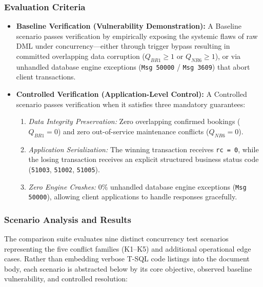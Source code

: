 \subsubsection{Evaluation Criteria}
\begin{itemize}
    \item \textbf{Baseline Verification (Vulnerability Demonstration):} A Baseline scenario passes verification by empirically exposing the systemic flaws of raw DML under concurrency—either through trigger bypass resulting in committed overlapping data corruption ($Q_{BR1} \ge 1$ or $Q_{NR6} \ge 1$), or via unhandled database engine exceptions (\texttt{Msg 50000} / \texttt{Msg 3609}) that abort client transactions.
    \item \textbf{Controlled Verification (Application-Level Control):} A Controlled scenario passes verification when it satisfies three mandatory guarantees:
    \begin{enumerate}
        \item \emph{Data Integrity Preservation:} Zero overlapping confirmed bookings ($Q_{BR1} = 0$) and zero out-of-service maintenance conflicts ($Q_{NR6} = 0$).
        \item \emph{Application Serialization:} The winning transaction receives \texttt{rc = 0}, while the losing transaction receives an explicit structured business status code (\texttt{51003}, \texttt{51002}, \texttt{51005}).
        \item \emph{Zero Engine Crashes:} 0\% unhandled database engine exceptions (\texttt{Msg 50000}), allowing client applications to handle responses gracefully.
    \end{enumerate}
\end{itemize}

\subsubsection{Scenario Analysis and Results}

The comparison suite evaluates nine distinct concurrency test scenarios representing the five conflict families (K1--K5) and additional operational edge cases. Rather than embedding verbose T-SQL code listings into the document body, each scenario is abstracted below by its core objective, observed baseline vulnerability, and controlled resolution:

